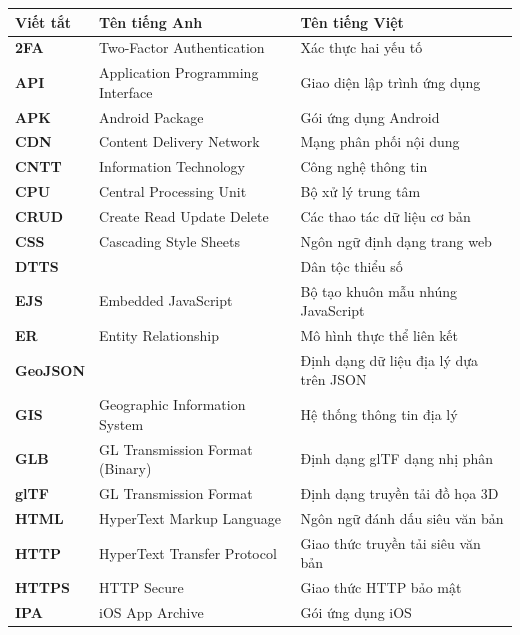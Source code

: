 \documentclass[../DoAn.tex]{subfiles}
\begin{document}
\begin{longtable}{l p{6cm} p{7cm}}
	\hline
       \textbf{Viết tắt}  & \textbf{Tên tiếng Anh}	& \textbf{Tên tiếng Việt} \\ \hline 
    \textbf{2FA}     & Two-Factor Authentication          & Xác thực hai yếu tố \\
    \textbf{API}     & Application Programming Interface   & Giao diện lập trình ứng dụng \\
    \textbf{APK}    & Android Package                    & Gói ứng dụng Android \\
    \textbf{CDN}     & Content Delivery Network           & Mạng phân phối nội dung \\
    \textbf{CNTT}   & Information Technology             & Công nghệ thông tin \\
    \textbf{CPU}     & Central Processing Unit            & Bộ xử lý trung tâm \\
    \textbf{CRUD}    & Create Read Update Delete          & Các thao tác dữ liệu cơ bản \\
    \textbf{CSS}     & Cascading Style Sheets             & Ngôn ngữ định dạng trang web \\
    \textbf{DTTS}    &                                 & Dân tộc thiểu số \\
    \textbf{EJS}     & Embedded JavaScript                & Bộ tạo khuôn mẫu nhúng JavaScript \\
   \textbf{ER}      & Entity Relationship                & Mô hình thực thể liên kết \\
    \textbf{GeoJSON} &                                & Định dạng dữ liệu địa lý dựa trên JSON \\
    \textbf{GIS}    & Geographic Information System      & Hệ thống thông tin địa lý \\
    \textbf{GLB }    & GL Transmission Format (Binary)    & Định dạng glTF dạng nhị phân \\
    \textbf{glTF}    & GL Transmission Format             & Định dạng truyền tải đồ họa 3D \\
   \textbf{ HTML}    & HyperText Markup Language          & Ngôn ngữ đánh dấu siêu văn bản \\
   \textbf{HTTP}    & HyperText Transfer Protocol        & Giao thức truyền tải siêu văn bản \\
    \textbf{HTTPS}   & HTTP Secure                        & Giao thức HTTP bảo mật \\
    \textbf{IPA}     & iOS App Archive                    & Gói ứng dụng iOS \\

\end{longtable}
\end{document}

